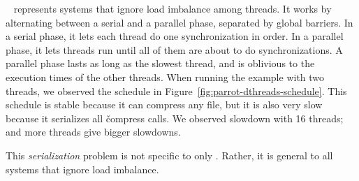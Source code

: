 \dthreads~\cite{dthreads:sosp11} represents \smt systems that
ignore load imbalance among threads.  It works by
alternating between a serial and a parallel phase, separated by global
barriers.  In a serial phase, it lets each thread do one synchronization in
order.  In a parallel phase, it lets threads run until all of them are about
to do synchronizations.  A parallel phase lasts as long as the slowest
thread, and is oblivious to the execution times of the other threads.  When
running the example with two threads, we observed the \dthreads schedule
in Figure~\ref{fig:parrot-dthreads-schedule}.  This schedule is stable because it
can compress any file, but it is also very slow because it serializes all
\v{compress} calls.  We observed \dthreadsexampleoverhead slowdown
with 16 threads; and more threads give bigger slowdowns.

This \emph{serialization} problem is not specific to only
\dthreads. Rather, it is general to all \smt systems that ignore load
imbalance.






